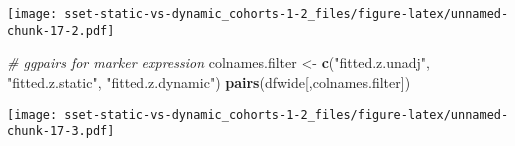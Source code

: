 \documentclass[
]{article}
\newenvironment{Shaded}{\begin{snugshade}}{\end{snugshade}}
\newcommand{\CommentTok}[1]{\textcolor[rgb]{0.56,0.35,0.01}{\textit{#1}}}
\newcommand{\FunctionTok}[1]{\textcolor[rgb]{0.13,0.29,0.53}{\textbf{#1}}}
\newcommand{\NormalTok}[1]{#1}
\newcommand{\OtherTok}[1]{\textcolor[rgb]{0.56,0.35,0.01}{#1}}
\newcommand{\StringTok}[1]{\textcolor[rgb]{0.31,0.60,0.02}{#1}}
\begin{document}
\texttt{[image: sset-static-vs-dynamic\_cohorts-1-2\_files/figure-latex/unnamed-chunk-17-2.pdf]}

\begin{Shaded}
\begin{Highlighting}[]
\CommentTok{\# ggpairs for marker expression}
\NormalTok{colnames.filter }\OtherTok{\textless{}{-}} \FunctionTok{c}\NormalTok{(}\StringTok{"fitted.z.unadj"}\NormalTok{, }\StringTok{"fitted.z.static"}\NormalTok{, }\StringTok{"fitted.z.dynamic"}\NormalTok{)}
\FunctionTok{pairs}\NormalTok{(dfwide[,colnames.filter])}
\end{Highlighting}
\end{Shaded}

\texttt{[image: sset-static-vs-dynamic\_cohorts-1-2\_files/figure-latex/unnamed-chunk-17-3.pdf]}
\end{document}
